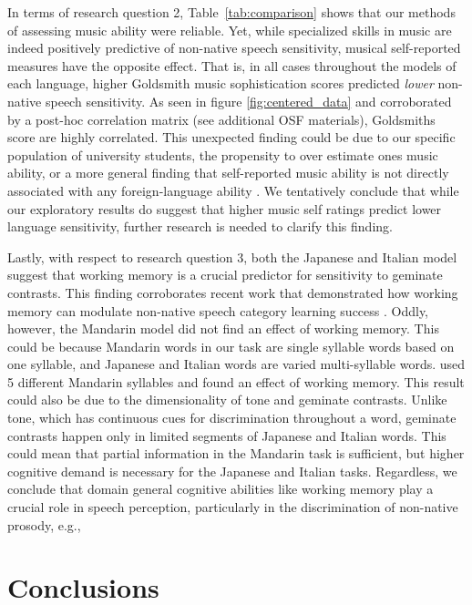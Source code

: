 \documentclass[a4paper]{article}
\begin{document}
In terms of research question 2, Table~\ref{tab:comparison} shows that our methods of assessing music ability were reliable. Yet, while specialized skills in music are indeed positively predictive of non-native speech sensitivity, musical self-reported measures have the opposite effect. That is, in all cases throughout the models of each language, higher Goldsmith music sophistication scores predicted \emph{lower} non-native speech sensitivity. As seen in figure \ref{fig:centered_data} and corroborated by a post-hoc correlation matrix (see additional OSF materials), Goldsmiths score are highly correlated. This unexpected finding could be due to our specific population of university students, the propensity to over estimate ones music ability, or a more general finding that self-reported music ability is not directly associated with any foreign-language ability \cite{larrouy_maestri_et_al_2023_selfevaluation,correia_et_al_2023_selfawareness,schellenberg_et_al_2023_musical}. We tentatively conclude that while our exploratory results do suggest that higher music self ratings predict lower language sensitivity, further research is needed to clarify this finding. 

Lastly, with respect to research question 3, both the Japanese and Italian model suggest that working memory is a crucial predictor for sensitivity to geminate contrasts. This finding corroborates recent work that demonstrated how working memory can modulate non-native speech category learning success \cite{mchaney_et_al_2021_workingmemory}. Oddly, however, the Mandarin model did not find an effect of working memory. This could be because Mandarin words in our task are single syllable words based on one syllable, and Japanese and Italian words are varied multi-syllable words. \cite{mchaney_et_al_2021_workingmemory} used 5 different Mandarin syllables and found an effect of working memory. This result could also be due to the dimensionality of tone and geminate contrasts. Unlike tone, which has continuous cues for discrimination throughout a word, geminate contrasts happen only in limited segments of Japanese and Italian words. This could mean that partial information in the Mandarin task is sufficient, but higher cognitive demand is necessary for the Japanese and Italian tasks. Regardless, we conclude that domain general cognitive abilities like working memory play a crucial role in speech perception, particularly in the discrimination of non-native prosody, e.g., \cite{Kachlicka_Saito_Tierney_2019}

\section{Conclusions}
\end{document}
